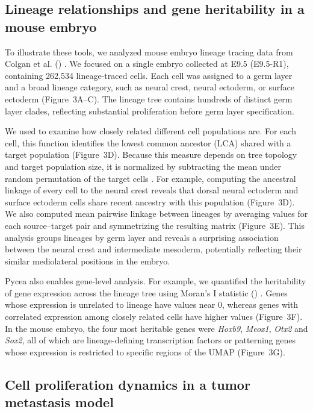 \subsection*{Lineage relationships and gene heritability in a mouse embryo}

To illustrate these tools, we analyzed mouse embryo lineage tracing data from Colgan et al. () \citep{colgan2026}. We focused on a single embryo collected at E9.5 (E9.5-R1), containing 262,534 lineage-traced cells. Each cell was assigned to a germ layer and a broad lineage category, such as neural crest, neural ectoderm, or surface ectoderm (Figure~3A–C). The lineage tree contains hundreds of distinct germ layer clades, reflecting substantial proliferation before germ layer specification.

We used  to examine how closely related different cell populations are. For each cell, this function identifies the lowest common ancestor (LCA) shared with a target population (Figure~3D). Because this measure depends on tree topology and target population size, it is normalized by subtracting the mean under random permutation of the target cells \citep{chan2019molecular,fang2022qfm}. For example, computing the ancestral linkage of every cell to the neural crest reveals that dorsal neural ectoderm and surface ectoderm cells share recent ancestry with this population (Figure~3D). We also computed mean pairwise linkage between lineages by averaging values for each source–target pair and symmetrizing the resulting matrix (Figure~3E). This analysis groups lineages by germ layer and reveals a surprising association between the neural crest and intermediate mesoderm, potentially reflecting their similar mediolateral positions in the embryo.

Pycea also enables gene-level analysis. For example, we quantified the heritability of gene expression across the lineage tree using Moran's I statistic () \citep{moran1950}. Genes whose expression is unrelated to lineage have values near 0, whereas genes with correlated expression among closely related cells have higher values (Figure~3F). In the mouse embryo, the four most heritable genes were \textit{Hoxb9}, \textit{Meox1}, \textit{Otx2} and \textit{Sox2}, all of which are lineage-defining transcription factors or patterning genes whose expression is restricted to specific regions of the UMAP (Figure~3G).

\subsection*{Cell proliferation dynamics in a tumor metastasis model}

